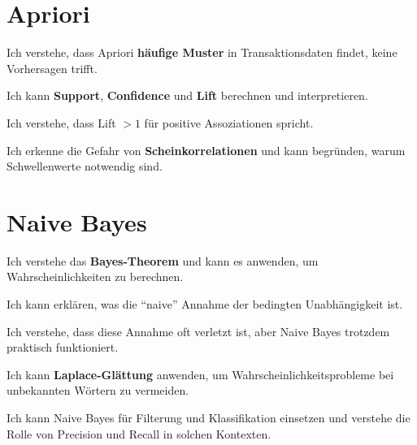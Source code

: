 \section{Apriori}
\begin{todolist}
    \item Ich verstehe, dass Apriori \textbf{häufige Muster} in Transaktionsdaten findet, keine Vorhersagen trifft.
    \item Ich kann \textbf{Support}, \textbf{Confidence} und \textbf{Lift} berechnen und interpretieren.
    \item Ich verstehe, dass Lift $> 1$ für positive Assoziationen spricht.
    \item Ich erkenne die Gefahr von \textbf{Scheinkorrelationen} und kann begründen, warum Schwellenwerte notwendig sind.
\end{todolist}

\section{Naive Bayes}
\begin{todolist}
    \item Ich verstehe das \textbf{Bayes-Theorem} und kann es anwenden, um Wahrscheinlichkeiten zu berechnen.
    \item Ich kann erklären, was die \enquote{naive} Annahme der bedingten Unabhängigkeit ist.
    \item Ich verstehe, dass diese Annahme oft verletzt ist, aber Naive Bayes trotzdem praktisch funktioniert.
    \item Ich kann \textbf{Laplace-Glättung} anwenden, um Wahrscheinlichkeitsprobleme bei unbekannten Wörtern zu vermeiden.
    \item Ich kann Naive Bayes für Filterung und Klassifikation einsetzen und verstehe die Rolle von Precision und Recall in solchen Kontexten.
\end{todolist}


